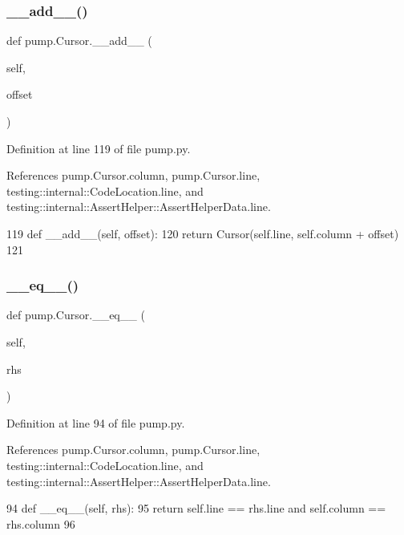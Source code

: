 \subsubsection{\texorpdfstring{\+\_\+\+\_\+add\+\_\+\+\_\+()}{\_\_add\_\_()}}
{\footnotesize\ttfamily def pump.\+Cursor.\+\_\+\+\_\+add\+\_\+\+\_\+ (\begin{DoxyParamCaption}\item[{}]{self,  }\item[{}]{offset }\end{DoxyParamCaption})}



Definition at line 119 of file pump.\+py.



References pump.\+Cursor.\+column, pump.\+Cursor.\+line, testing\+::internal\+::\+Code\+Location.\+line, and testing\+::internal\+::\+Assert\+Helper\+::\+Assert\+Helper\+Data.\+line.


\begin{DoxyCode}
119   \textcolor{keyword}{def }\_\_add\_\_(self, offset):
120     \textcolor{keywordflow}{return} Cursor(self.line, self.column + offset)
121 
\end{DoxyCode}
\mbox{\label{classpump_1_1Cursor_ab430cfd4cfd2fa2b57ea31b128e56f22}} 
\subsubsection{\texorpdfstring{\+\_\+\+\_\+eq\+\_\+\+\_\+()}{\_\_eq\_\_()}}
{\footnotesize\ttfamily def pump.\+Cursor.\+\_\+\+\_\+eq\+\_\+\+\_\+ (\begin{DoxyParamCaption}\item[{}]{self,  }\item[{}]{rhs }\end{DoxyParamCaption})}



Definition at line 94 of file pump.\+py.



References pump.\+Cursor.\+column, pump.\+Cursor.\+line, testing\+::internal\+::\+Code\+Location.\+line, and testing\+::internal\+::\+Assert\+Helper\+::\+Assert\+Helper\+Data.\+line.


\begin{DoxyCode}
94   \textcolor{keyword}{def }\_\_eq\_\_(self, rhs):
95     \textcolor{keywordflow}{return} self.line == rhs.line \textcolor{keywordflow}{and} self.column == rhs.column
96 
\end{DoxyCode}
\mbox{\label{classpump_1_1Cursor_aeadc1924f4435a1a67fada88b0bce40a}} 
